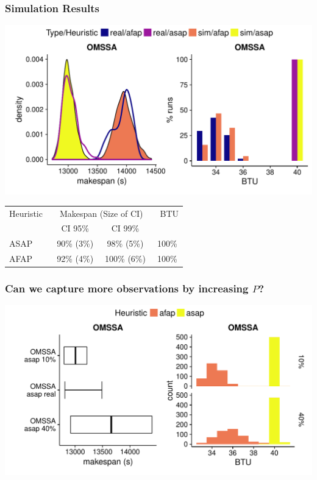 \documentclass{beamer}
\begin{document}
\begin{frame}
	\frametitle{Simulation Results}
	\begin{center}
	\includegraphics[height=0.6\textheight]{gfx/fit.pdf}\\
	{\small
	\begin{tabular}{lccc}
		\toprule
		Heuristic~&\multicolumn{2}{c}{~Makespan (Size of
		CI)~}&~BTU\\
		 & CI 95\% & CI 99\% &\\
		\midrule
		ASAP& 90\% (3\%)& 98\% (5\%)& 100\%\\
		AFAP& 92\% (4\%)& 100\% (6\%)& 100\%\\
		\bottomrule
	\end{tabular}
	}
	\end{center}
\end{frame}

\begin{frame}
	\frametitle{Can we capture more observations by increasing $P$?}
	\includegraphics[width=\textwidth]{gfx/int.pdf}
\end{frame}
\end{document}
